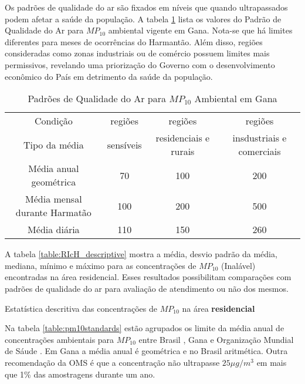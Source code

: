 Os padrões de qualidade do ar são fixados em níveis que quando ultrapassados 
podem afetar a saúde da população. 
A tabela \ref{table:padroesgana} lista os valores do Padrão de Qualidade do Ar 
para $MP_{10}$ ambiental vigente em Gana. Nota-se que há limites diferentes para 
meses de ocorrências do Harmantão. Além disso, regiões consideradas como zonas
industriais ou de comércio possuem limites mais permissivos, revelando 
uma priorização do Governo com o desenvolvimento econômico do País em 
detrimento da saúde da população.

\begin{table}[H]
\centering
\begin{tabular}{cccc}
\hline
Condição                      &   regiões  &        regiões       &         regiões               \\
Tipo da média                 & sensíveis & residenciais e rurais & insdustriais e comerciais      \\
\hline
Média anual geométrica        & 70              & 100                      & 200                   \\
Média mensal durante Harmatão & 100             & 200                      & 500                     \\
Média diária                  & 110             & 150                      & 260         \\               
\hline
\end{tabular}
\caption{Padrões de Qualidade do Ar para $MP_{10}$ Ambiental em Gana
         \cite{epa2015} \label{table:padroesgana}}
\end{table}

A tabela \ref{table:RIcH_descriptive} mostra a média, desvio padrão da média,
mediana, mínimo e máximo para as concentrações de $MP_{10}$ (Inalável) 
encontradas na área residencial. Esses resultados possibilitam comparações com 
padrões de qualidade do ar para avaliação de atendimento ou não dos mesmos.    

\begin{table}[H]
  \centering
    
  \caption{Estatística descritiva das concentrações de  $MP_{10}$ na área 
           \textbf{residencial} \label{table:RIcH_descriptive}}
\end{table}

Na tabela \ref{table:pm10standards} estão agrupados os limite da média anual de 
concentrações ambientais para $MP_{10}$ entre Brasil \citep{conama1990}, 
Gana \citep{epa2015} e Organização Mundial de Sáude \citep{who}. 
Em Gana a média anual é geométrica e no Brasil aritmética.
Outra recomendação da OMS é que a concentração não ultrapasse $25 \mu g/m^3$ 
em mais que 1\% das amostragens durante um ano. 


